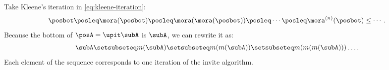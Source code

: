 Take Kleene's iteration in \cref{eq:kleene-iteration}:
\begin{equation}
    \posbot\posleq \mora(\posbot)\posleq \mora(\mora(\posbot))\posleq\cdots\posleq \mora^{(n)}(\posbot)\leq\cdots.
\end{equation}
Because the bottom of $\posA = \upit \subA$ is $\subA$, we can rewrite it as:
\begin{equation}
    \subA \setsubseteq  m(\subA ) \setsubseteq m(m(\subA)) \setsubseteq m(m(m(\subA))) \dots .
\end{equation}
Each element of the sequence  corresponds to one iteration of the invite algorithm.

